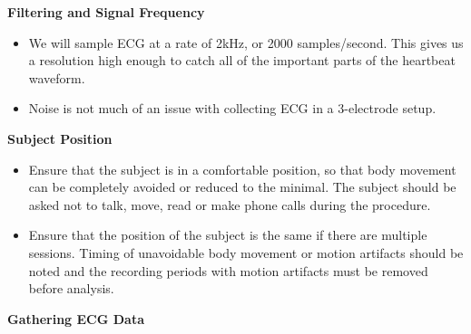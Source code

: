 \documentclass[
]{book}
\providecommand{\tightlist}{%
  \setlength{\itemsep}{0pt}\setlength{\parskip}{0pt}}
\begin{document}
\textbf{Filtering and Signal Frequency}

\begin{itemize}
\tightlist
\item
  We will sample ECG at a rate of 2kHz, or 2000 samples/second. This gives us a resolution high enough to catch all of the important parts of the heartbeat waveform.
\item
  Noise is not much of an issue with collecting ECG in a 3-electrode setup.
\end{itemize}

\textbf{Subject Position}

\begin{itemize}
\tightlist
\item
  Ensure that the subject is in a comfortable position, so that body movement can be completely avoided or reduced to the minimal. The subject should be asked not to talk, move, read or make phone calls during the procedure.
\item
  Ensure that the position of the subject is the same if there are multiple sessions. Timing of unavoidable body movement or motion artifacts should be noted and the recording periods with motion artifacts must be removed before analysis.
\end{itemize}

\textbf{Gathering ECG Data}
\end{document}
